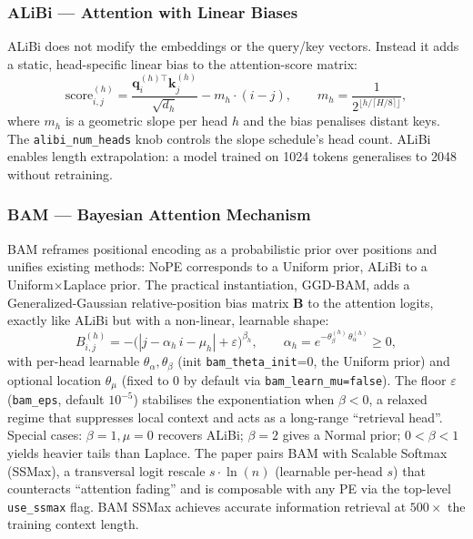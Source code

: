 \subsubsection{ALiBi --- Attention with Linear Biases}

ALiBi \citep{press_alibi_2022} does not modify the embeddings or the
query/key vectors. Instead it adds a static, head-specific linear bias
to the attention-score matrix:
\[
\text{score}_{i,j}^{(h)} = \frac{\mathbf{q}_i^{(h)\top}\mathbf{k}_j^{(h)}}{\sqrt{d_h}} - m_h \cdot (i - j), \qquad m_h = \frac{1}{2^{\lfloor h / \lceil H/8 \rceil \rfloor}},
\]
where $m_h$ is a geometric slope per head $h$ and the bias penalises
distant keys. The \texttt{alibi\_num\_heads} knob controls the slope
schedule's head count. ALiBi enables length extrapolation: a model
trained on 1024 tokens generalises to 2048 without retraining.

\subsubsection{BAM --- Bayesian Attention Mechanism}

BAM \citep{bianchessi_bam_2025} reframes positional encoding as a
probabilistic prior over positions and unifies existing methods: NoPE
corresponds to a Uniform prior, ALiBi to a Uniform$\times$Laplace prior.
The practical instantiation, GGD-BAM, adds a Generalized-Gaussian
relative-position bias matrix $\mathbf{B}$ to the attention logits,
exactly like ALiBi but with a non-linear, learnable shape:
\[
B_{i,j}^{(h)} = -\bigl(|j - \alpha_h \, i - \mu_h| + \varepsilon\bigr)^{\beta_h}, \qquad \alpha_h = e^{-\theta_\beta^{(h)}\,\theta_\alpha^{(h)}} \ge 0,
\]
with per-head learnable $\theta_\alpha, \theta_\beta$ (init \texttt{bam\_theta\_init}=0,
the Uniform prior) and optional location $\theta_\mu$ (fixed to 0 by default
via \texttt{bam\_learn\_mu=false}). The floor $\varepsilon$
(\texttt{bam\_eps}, default $10^{-5}$) stabilises the exponentiation when
$\beta < 0$, a relaxed regime that suppresses local context and acts as a
long-range ``retrieval head''. Special cases: $\beta=1, \mu=0$ recovers
ALiBi; $\beta=2$ gives a Normal prior; $0<\beta<1$ yields heavier tails than
Laplace. The paper pairs BAM with Scalable Softmax (SSMax), a transversal
logit rescale $s\cdot\ln(n)$ (learnable per-head $s$) that counteracts
``attention fading'' and is composable with any PE via the top-level
\texttt{use\_ssmax} flag. BAM SSMax achieves accurate information retrieval
at $500\times$ the training context length.

